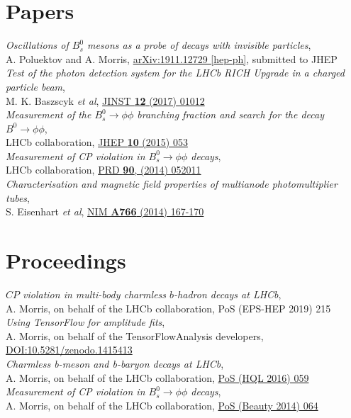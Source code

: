 \documentclass[contbibnum,titleabove]{simplecv}
\begin{document}
	\section{Papers}
	\vspace{0.5em}
	\textit{Oscillations of $B_s^0$ mesons as a probe of decays with invisible particles},\\ A. Poluektov and A. Morris, \href{https://arxiv.org/abs/1911.12729}{arXiv:1911.12729 [hep-ph]}, submitted to JHEP\\[1ex]
	\textit{Test of the photon detection system for the LHCb RICH Upgrade in a charged particle beam},\\ M. K. Baszscyk \textit{et al}, \href{http://cds.cern.ch/record/2197586}{JINST \textbf{12} (2017) 01012}\\[1ex]
	\textit{Measurement of the $B^0_s \to \phi\phi$ branching fraction and search for the decay $B^0 \to \phi \phi$},\\ LHCb collaboration, \href{http://dx.doi.org/10.1007/JHEP10(2015)053}{JHEP \textbf{10} (2015) 053}\\[1ex]
	\textit{Measurement of CP violation in $B^0_s \to \phi\phi$ decays},\\ LHCb collaboration, \href{http://dx.doi.org/10.1103/PhysRevD.90.052011}{PRD \textbf{90}, (2014) 052011}\\[1ex]
	\textit{Characterisation and magnetic field properties of multianode photomultiplier tubes},\\ S. Eisenhart \textit{et al}, \href{http://dx.doi.org/10.1016/j.nima.2014.05.036}{NIM \textbf{A766} (2014) 167-170}\\[1ex]
	\section{Proceedings}
	\vspace{0.5em}
	\textit{$C\!P$ violation in multi-body charmless $b$-hadron decays at LHCb},\\ A. Morris, on behalf of the LHCb collaboration, PoS (EPS-HEP 2019) 215\\[1ex]
	\textit{Using TensorFlow for amplitude fits},\\ A. Morris, on behalf of the TensorFlowAnalysis developers, \href{https://doi.org/10.5281/zenodo.1415413}{DOI:10.5281/zenodo.1415413}\\[1ex]
	\textit{Charmless b-meson and b-baryon decays at LHCb},\\ A. Morris, on behalf of the LHCb collaboration, \href{https://pos.sissa.it/cgi-bin/reader/contribution.cgi?id=274/059}{PoS (HQL 2016) 059}\\[1ex]
	\textit{Measurement of CP violation in $B^0_s \to \phi\phi$ decays},\\ A. Morris, on behalf of the LHCb collaboration, \href{https://pos.sissa.it/cgi-bin/reader/contribution.cgi?id=216/064}{PoS (Beauty 2014) 064}\\[1ex]
\end{document}

